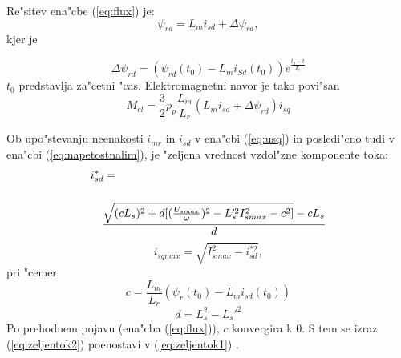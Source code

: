 \documentclass[journal,a4paper,twoside]{sty/IEEEtran}
\begin{document}
Re"sitev ena"cbe (\ref{eq:flux}) je:
\begin{equation}
\label{eq:Lm+delta}
\psi_{rd}=L_m i_{sd}+\Delta \psi_{rd}\mathrm{,}
\end{equation}
 kjer je
 
 \begin{equation}
\label{eq:delta}
\Delta \psi_{rd}=(\psi_{rd}(t_0)-L_m i_{Sd}(t_0))e^{\frac{t_0-t}{T_r}}
\end{equation}
$t_0$ predstavlja za"cetni "cas. Elektromagnetni navor je tako povi"san
\begin{equation}
\label{navor3}
M_{el}=\frac{3}{2}p_p \frac{L_m}{L_r}(L_m i_{sd}+\Delta \psi_{rd})i_{sq}
\end{equation}

Ob upo"stevanju neenakosti $i_{mr}$ in $i_{sd}$ v ena"cbi (\ref{eq:usq}) in posledi"cno tudi v ena"cbi (\ref{eq:napetostnalim}), je "zeljena vrednost vzdol"zne komponente toka:
\begin{equation}
\label{eq:zeljentok2}
\centering
\begin{multlined}
i_{sd}^*= \\ \\
\frac{\sqrt{(c L_s)^2+d[(\frac{U_{smax}}{\omega})^2-L_s'^2I_{smax}^2-c^2]}-cL_s}{d}                 
\end{multlined}
\end{equation}
\begin{equation}
i_{sqmax}=\sqrt{I_{smax}^2-i_{sd}^{*2}},
\end{equation}
pri "cemer
$$c=\frac{L_m}{L_r}(\psi_{r}(t_0)-L_m i_{sd}(t_0))$$
$$d=L_s^2-L_s'^2$$
Po prehodnem pojavu (ena"cba (\ref{eq:flux})), $c$ konvergira k 0. S tem se izraz (\ref{eq:zeljentok2}) poenostavi v (\ref{eq:zeljentok1}) \cite{vas}.
\end{document}
